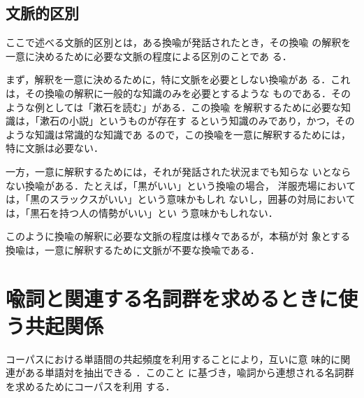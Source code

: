\subsection{文脈的区別}
\label{sec:context}

ここで述べる文脈的区別とは，ある換喩が発話されたとき，その換喩
の解釈を一意に決めるために必要な文脈の程度による区別のことであ
る．

まず，解釈を一意に決めるために，特に文脈を必要としない換喩があ
る．これは，その換喩の解釈に一般的な知識のみを必要とするような
ものである．そのような例としては「漱石を読む」がある．この換喩
を解釈するために必要な知識は，「漱石の小説」というものが存在す
るという知識のみであり，かつ，そのような知識は常識的な知識であ
るので，この換喩を一意に解釈するためには，特に文脈は必要ない．

一方，一意に解釈するためには，それが発話された状況までも知らな
いとならない換喩がある．たとえば，「黒がいい」という換喩の場合，
洋服売場においては，「黒のスラックスがいい」という意味かもしれ
ないし，囲碁の対局においては，「黒石を持つ人の情勢がいい」とい
う意味かもしれない．

このように換喩の解釈に必要な文脈の程度は様々であるが，本稿が対
象とする換喩は，一意に解釈するために文脈が不要な換喩である．

\section{喩詞と関連する名詞群を求めるときに使う共起関係}
\label{sec:corpus}

コーパスにおける単語間の共起頻度を利用することにより，互いに意
味的に関連がある単語対を抽出できる
\cite[など]{church89:_word_assoc_norms_mutual_infor_lexic,brown92:_class_based_model_natur_languag}．このこと
に基づき，喩詞から連想される名詞群を求めるためにコーパスを利用
する．

